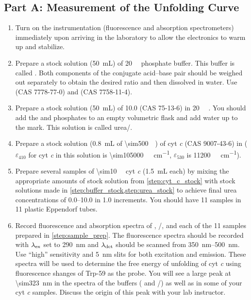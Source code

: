 \documentclass[nobib,nofonts,nols,nohyper]{tufte-handout}
\begin{document}
\subsection{Part A: Measurement of the Unfolding Curve} %
\label{sub:part_a_measurement_of_the_unfolding_curve}

\begin{enumerate}
	\item Turn on the instrumentation (fluorescence and absorption spectrometers) immediately upon arriving in the laboratory to allow the electronics to warm up and stabilize. 
	\item Prepare a stock solution (\qty{50}{\mL}) of \qty{20}{\milli\Molar}  phosphate buffer. 
	This buffer is called . 
	Both components of the conjugate acid--base pair should be weighed out separately to obtain the desired ratio and then dissolved in water. 
	Use  (CAS 7778-77-0) and  (CAS 7758-11-4).
	\label{step:buffer_stock}
	\item Prepare a stock solution (\qty{50}{\mL}) of \qty{10.0}{\Molar}  (CAS 75-13-6) in \qty{20}{\milli\Molar} . 
	You should add the  and phosphates to an empty volumetric flask and add water up to the mark. 
	This solution is called urea/. 
	\label{step:urea_stock}
	\item Prepare a stock solution (\qty{0.8}{\mL} of \qty{\sim500}{\milli\Molar}) of cyt \emph{c} (CAS 9007-43-6) in  (\( \varepsilon_{410} \) for cyt \emph{c} in this solution is \qty{\sim105000}{\per\Molar\per\cm}, \( \varepsilon_{530} \) is \qty{11200}{\per\Molar\per\cm}).
	\label{step:cyt_c_stock}
	\item Prepare several samples of \qty{\sim10}{\micro\Molar} cyt \emph{c} (\qty{1.5}{\mL} each) by mixing the appropriate amounts of stock solution from \cref{step:cyt_c_stock} with stock solutions made in \cref{step:buffer_stock,step:urea_stock} to achieve final urea concentrations of \qtyrange{0.0}{10.0}{\Molar} in \qty{1.0}{\Molar} increments. 
	You should have \num{11} samples in \num{11} plastic Eppendorf tubes.
	\label{step:sample_prep}
	\item Record fluorescence and absorption spectra of , /, and each of the \num{11} samples prepared in \cref{step:sample_prep}. 
	The fluorescence spectra should be recorded with \( \lambda_{\textnormal{ex}} \) set to \qty{290}{\nm} and \( \lambda_{\textnormal{det}} \) should be scanned from \qtyrange{350}{500}{\nm}. 
	Use ``high'' sensitivity and \qty{5}{\nm} slits for both excitation and emission. 
	These spectra will be used to determine the free energy of unfolding of cyt \emph{c} using fluorescence shanges of Trp-59 as the probe. 
	You will see a large peak at \qty{\sim323}{\nm} in the spectra of the buffers ( and /) as well as in some of your cyt \emph{c} samples. 
	Discuss the origin of this peak with your lab instructor. 
	\label{step:fluor_spec}
\end{enumerate}
\end{document}
